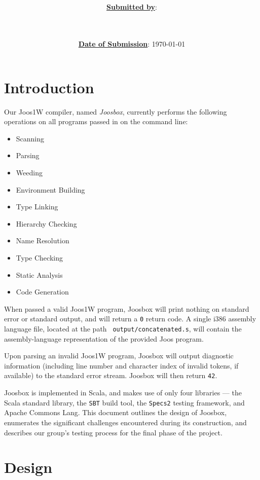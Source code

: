 \documentclass[letterpaper]{article}
\title{\course \\ \term \\ \project}
\date{\ul{\textbf{Date of Submission}}: \today}
\author{\ul{\textbf{Submitted by}}: \\ \indent \wenhao \\ \indent \chris \\ \indent \peter}
\begin{document}
  \maketitle
  \thispagestyle{empty}
  \clearpage

  \setcounter{page}{1}

  \clearpage
  \section{Introduction}

  Our Joos1W compiler, named {\em Joosbox}, currently performs the following
  operations on all programs passed in on the command line:

  \begin{itemize}
    \item Scanning
    \item Parsing
    \item Weeding
    \item Environment Building
    \item Type Linking
    \item Hierarchy Checking
    \item Name Resolution
    \item Type Checking
    \item Static Analysis
    \item Code Generation
  \end{itemize}

  When passed a valid Joos1W program, Joosbox will print nothing on standard
  error or standard output, and will return a {\tt 0} return code. A single
  i386 assembly language file, located at the path {\tt
  output/concatenated.s}, will contain the assembly-language representation of
  the provided Joos program.

  Upon parsing an invalid Joos1W program, Joosbox will output diagnostic
  information (including line number and character index of invalid tokens, if
  available) to the standard error stream. Joosbox will then return {\tt 42}.

  Joosbox is implemented in Scala, and makes use of only four libraries ---
  the Scala standard library, the {\tt SBT} build tool, the {\tt Specs2}
  testing framework, and Apache Commons Lang. This document outlines the
  design of Joosbox, enumerates the significant challenges encountered during
  its construction, and describes our group's testing process for the final
  phase of the project.

  \section{Design}
\end{document}
